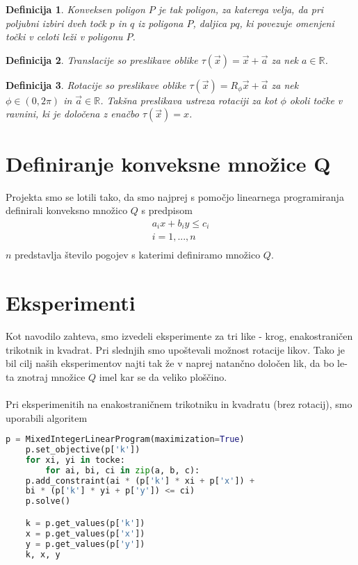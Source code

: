 \documentclass[a4paper, 12pt]{article}
\newtheorem{definicija}{Definicija}
\begin{document}
\begin{definicija}
    Konveksen poligon $P$ je tak poligon, za katerega velja, da pri poljubni izbiri dveh točk $p$ in $q$
     iz poligona $P$, daljica $pq$, ki povezuje omenjeni točki v celoti leži v poligonu $P$.
\end{definicija}

\begin{definicija}
    Translacije so preslikave oblike $\tau(\vec{x}) = \vec{x} + \vec{a}$ za nek $a \in \mathbb{R}$.
\end{definicija}

\begin{definicija}
    Rotacije so preslikave oblike $\tau (\vec{x}) = R_{\phi}\vec{x} + \vec{a}$ za nek $\phi \in (0, 2\pi)$ in $\vec{a} \in \mathbb{R}$. 
    Takšna preslikava ustreza rotaciji za kot $\phi$ okoli točke v ravnini, ki je določena z enačbo $\tau (\vec{x}) = x$. 
\end{definicija}


\section{Definiranje konveksne množice Q}
Projekta smo se lotili tako, da smo najprej s pomočjo linearnega programiranja definirali konveksno množico $Q$ s predpisom
\begin{align*}
    a_i x + b_i y \le c_i \\
    i = 1, ..., n \\
\end{align*}
$n$ predstavlja število pogojev s katerimi definiramo množico $Q$.
\newpage
\section{Eksperimenti}
Kot navodilo zahteva, smo izvedeli eksperimente za tri like - krog, enakostraničen trikotnik in kvadrat. Pri slednjih smo upoštevali možnost rotacije likov.
\newline
Tako je bil cilj naših eksperimentov najti tak že v naprej natančno določen lik, da bo le-ta znotraj množice $Q$ imel kar se da veliko ploščino.
\\~\\
Pri eksperimenitih na enakostraničnem trikotniku in kvadratu (brez rotacij), smo uporabili algoritem 
\begin{lstlisting}[language=Python]
    p = MixedIntegerLinearProgram(maximization=True) 
    p.set_objective(p['k'])
    for xi, yi in tocke:
        for ai, bi, ci in zip(a, b, c):
    p.add_constraint(ai * (p['k'] * xi + p['x']) + 
    bi * (p['k'] * yi + p['y']) <= ci)
    p.solve()

    k = p.get_values(p['k']) 
    x = p.get_values(p['x'])
    y = p.get_values(p['y'])
    k, x, y
\end{lstlisting}
\end{document}
